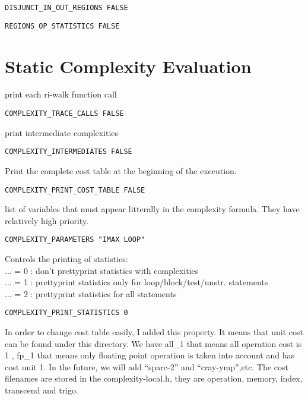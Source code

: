 \begin{verbatim}
DISJUNCT_IN_OUT_REGIONS FALSE
\end{verbatim}


\begin{verbatim}
REGIONS_OP_STATISTICS FALSE
\end{verbatim}


\section{Static Complexity Evaluation}

print each ri-walk function call

\begin{verbatim}
COMPLEXITY_TRACE_CALLS FALSE
\end{verbatim}


print intermediate complexities 

\begin{verbatim}
COMPLEXITY_INTERMEDIATES FALSE
\end{verbatim}

Print the complete cost table at the beginning of the execution.

\begin{verbatim}
COMPLEXITY_PRINT_COST_TABLE FALSE
\end{verbatim}

list of variables that must appear litterally in the complexity formula.
They have relatively high priority.

\begin{verbatim}
COMPLEXITY_PARAMETERS "IMAX LOOP"
\end{verbatim}

Controls the printing of statistics:    \\
 ... = 0 : don't prettyprint statistics with complexities  \\
 ... = 1 : prettyprint statistics only for loop/block/test/unstr.
statements \\
 ... = 2 : prettyprint statistics for all statements

\begin{verbatim}
COMPLEXITY_PRINT_STATISTICS 0
\end{verbatim}

In order to change cost table easily, I added this property.
It means that unit cost can be found under this directory. We have all\_1
that means all operation cost is 1 , fp\_1 that means only floating
point operation is taken into account and has cost unit 1.
In the future, we will add ``sparc-2'' and ``cray-ymp'',etc.
The cost filenames are stored in the complexity-local.h, they are operation,
memory, index, transcend and trigo.


